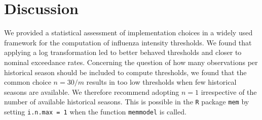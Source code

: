 \documentclass{article}
\begin{document}






\section{Discussion}
\label{sec:discussion}

We provided a statistical assessment of implementation choices in a widely used framework for the computation of influenza intensity thresholds. We found that applying a log transformation led to better behaved thresholds and closer to nominal exceedance rates. Concerning the question of how many observations per historical season should be included to compute thresholds, we found that the common choice $n = 30/m$ results in too low thresholds when few historical seasons are available. We therefore recommend adopting $n = 1$ irrespective of the number of available historical seasons. This is possible in the \texttt{R} package \texttt{mem} by setting \texttt{i.n.max = 1} when the function \texttt{memmodel} is called.
\end{document}
